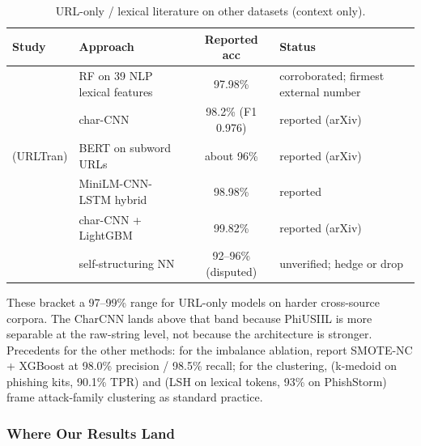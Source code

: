 \documentclass[stu,12pt,floatsintext]{apa7}
\begin{document}
\begin{table}[htbp]
\centering
\caption{URL-only / lexical literature on other datasets (context only).}
\label{tab:sota-urlonly}
\footnotesize
\setlength{\tabcolsep}{4pt}
\begin{tabularx}{\linewidth}{Y>{\raggedright\arraybackslash}p{2.5cm}cY}
\toprule
Study & Approach & Reported acc & Status \\
\midrule
\textcite{sahingoz2019} & RF on 39 NLP lexical features & 97.98\% &
  corroborated; firmest external number \\
\textcite{yerima2020} & char-CNN & 98.2\% (F1 0.976) & reported (arXiv) \\
\textcite{maneriker2021urltran} (URLTran) & BERT on subword URLs &
  about 96\% & reported (arXiv) \\
\textcite{minilm2024} & MiniLM-CNN-LSTM hybrid & 98.98\% & reported \\
\textcite{dubey2025} & char-CNN + LightGBM & 99.82\% & reported (arXiv) \\
\textcite{mohammad2014} & self-structuring NN & 92--96\% (disputed) &
  unverified; hedge or drop \\
\bottomrule
\end{tabularx}
\end{table}

These bracket a 97--99\% range for URL-only models on harder cross-source
corpora. The CharCNN lands above that band because PhiUSIIL is more
separable at the raw-string level, not because the architecture is
stronger. Precedents for the other methods: for the imbalance ablation,
\textcite{omari2025} report SMOTE-NC + XGBoost at 98.0\% precision /
98.5\% recall; for the clustering, \textcite{feng2022} (k-medoid on
phishing kits, 90.1\% TPR) and \textcite{zia2025} (LSH on lexical tokens,
93\% on PhishStorm) frame attack-family clustering as standard practice.

\subsubsection{Where Our Results Land}
\end{document}
